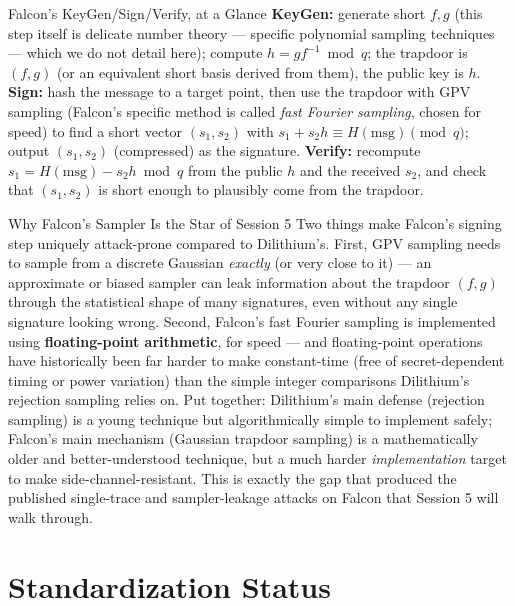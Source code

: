 \begin{rmkbox}{Falcon's KeyGen/Sign/Verify, at a Glance}
\textbf{KeyGen:} generate short $f,g$ (this step itself is delicate number theory --- specific polynomial sampling techniques --- which we do not detail here); compute $h=g f^{-1} \bmod q$; the trapdoor is $(f,g)$ (or an equivalent short basis derived from them), the public key is $h$. \textbf{Sign:} hash the message to a target point, then use the trapdoor with GPV sampling (Falcon's specific method is called \emph{fast Fourier sampling}, chosen for speed) to find a short vector $(s_1,s_2)$ with $s_1 + s_2 h \equiv H(\text{msg}) \pmod q$; output $(s_1,s_2)$ (compressed) as the signature. \textbf{Verify:} recompute $s_1 = H(\text{msg}) - s_2 h \bmod q$ from the public $h$ and the received $s_2$, and check that $(s_1,s_2)$ is short enough to plausibly come from the trapdoor.
\end{rmkbox}

\begin{previewbox}{Why Falcon's Sampler Is the Star of Session 5}
Two things make Falcon's signing step uniquely attack-prone compared to Dilithium's. First, GPV sampling needs to sample from a discrete Gaussian \emph{exactly} (or very close to it) --- an approximate or biased sampler can leak information about the trapdoor $(f,g)$ through the statistical shape of many signatures, even without any single signature looking wrong. Second, Falcon's fast Fourier sampling is implemented using \textbf{floating-point arithmetic}, for speed --- and floating-point operations have historically been far harder to make constant-time (free of secret-dependent timing or power variation) than the simple integer comparisons Dilithium's rejection sampling relies on. Put together: Dilithium's main defense (rejection sampling) is a young technique but algorithmically simple to implement safely; Falcon's main mechanism (Gaussian trapdoor sampling) is a mathematically older and better-understood technique, but a much harder \emph{implementation} target to make side-channel-resistant. This is exactly the gap that produced the published single-trace and sampler-leakage attacks on Falcon that Session 5 will walk through.
\end{previewbox}

\section{Standardization Status}
\label{sec:L4:standardization-status}

